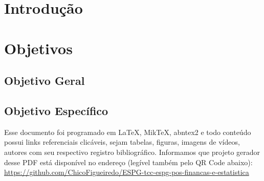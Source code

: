 \chapter{Introdução}
\chapter{Objetivos}

\section{Objetivo Geral}

\section{Objetivo Específico}

Esse documento foi programado em \LaTeX, MikTeX, abntex2 e todo conteúdo possui links referenciais clicáveis, sejam tabelas, figuras, imagens de vídeos, autores com seu respectivo registro bibliográfico.
Informamos que projeto gerador desse PDF está disponível no endereço (legível também pelo QR Code abaixo): \\
\url{https://github.com/ChicoFigueiredo/ESPG-tcc-espg-pos-financas-e-estatistica} \\
\begin{center}
    \href{https://github.com/ChicoFigueiredo/ESPG-tcc-espg-pos-financas-e-estatistica'}{
    }
\end{center}

